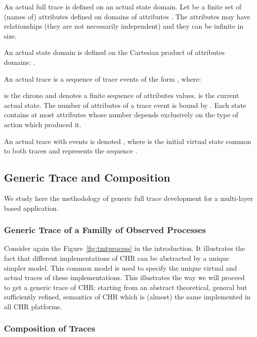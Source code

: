 An actual full trace is defined on an actual state domain. Let  be a finite set of (names of) attributes  defined on domains of attributes .
The attributes may have relationships (they are not necessarily independent) and they can be infinite in size.

An actual state domain  is defined on the Cartesian product of attributes domains: . 

\begin{definition} 

An actual trace is a sequence of trace events of the form {\bf }, where:

\noindent
 is the chrono and  denotes a finite sequence of attributes values.  is the current actual state. The number of attributes of a trace event is bound by . Each state  contains at most  attributes whose number depends exclusively on the type of action which produced it.
\end{definition}
An actual trace with   events is denoted , where  is the initial virtual state common to both traces and   represents the sequence .




\subsection{Generic Trace and Composition}

We study here the methodology of generic full trace development for a multi-layer based application.

\subsubsection{Generic Trace of a Familly of Observed Processes}

Consider again the Figure~\ref{fig:tmtprocess} in the introduction.
It illustrates the fact that different implementations of CHR can be abstracted by a unique simpler model.
This common model is used to specify the unique virtual and actual traces of these implementations.
This illustrates the way we will proceed to get a generic trace of CHR: starting from an abstract theoretical, general but sufficiently refined, semantics of CHR which is (almost) the same implemented in all CHR platforms.


\subsubsection{Composition of Traces}
\label{sec:compos}

